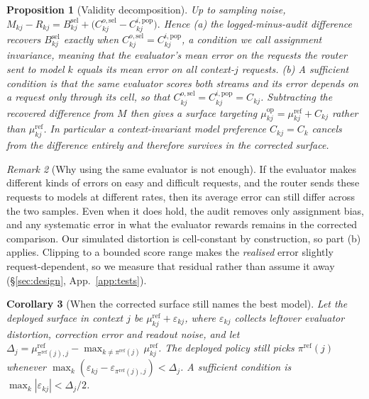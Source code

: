 \documentclass{article}
\theoremstyle{plain}
\newtheorem{proposition}{Proposition}[section]
\newtheorem{corollary}[proposition]{Corollary}
\theoremstyle{remark}
\newtheorem{remark}[proposition]{Remark}
\newcommand{\muref}{\mu^{\mathrm{ref}}}
\newcommand{\muop}{\mu^{\mathrm{op}}}
\newcommand{\Bsel}{B^{\mathrm{sel}}}
\newcommand{\piref}{\pi^{\mathrm{ref}}}
\begin{document}
\begin{proposition}[Validity decomposition]\label{prop:decomp}
Up to sampling noise,
$
M_{kj}-R_{kj}=\Bsel_{kj}+\bigl(C^{o,\mathrm{sel}}_{kj}-C^{i,\mathrm{pop}}_{kj}\bigr).
$
Hence \emph{(a)} the logged-minus-audit difference recovers $\Bsel_{kj}$ exactly when
$C^{o,\mathrm{sel}}_{kj}=C^{i,\mathrm{pop}}_{kj}$, a condition we call \emph{assignment invariance},
meaning that the evaluator's mean error on the requests the router sent to model $k$ equals its mean
error on all context-$j$ requests. \emph{(b)} A sufficient condition is that the same evaluator scores
both streams \emph{and} its error depends on a request only through its cell, so that
$C^{o,\mathrm{sel}}_{kj}=C^{i,\mathrm{pop}}_{kj}=C_{kj}$. Subtracting the recovered difference from
$M$ then gives a surface targeting $\muop_{kj}=\muref_{kj}+C_{kj}$ rather than $\muref_{kj}$. In
particular a context-invariant model preference $C_{kj}=C_k$ cancels from the difference entirely and
therefore \emph{survives} in the corrected surface.
\end{proposition}

\begin{remark}[Why using the same evaluator is not enough]\label{rem:samejudge}
If the evaluator makes different kinds of errors on easy and difficult requests, and the router sends
these requests to models at different rates, then its average error can still differ across the two
samples. Even when it does hold, the audit removes only assignment bias, and any systematic error in
what the evaluator rewards remains in the corrected comparison. Our simulated
distortion is cell-constant by construction, so part (b) applies. Clipping to a bounded score range
makes the \emph{realised} error slightly request-dependent, so we measure that residual rather than
assume it away (\S\ref{sec:design}, App.~\ref{app:tests}).
\end{remark}

\begin{corollary}[When the corrected surface still names the best model]\label{cor:margin}
Let the deployed surface in context $j$ be $\muref_{kj}+\varepsilon_{kj}$, where $\varepsilon_{kj}$
collects leftover evaluator distortion, correction error and readout noise, and let
$\Delta_j=\muref_{\piref(j),j}-\max_{k\neq\piref(j)}\muref_{kj}$. The deployed policy still picks
$\piref(j)$ whenever $\max_k(\varepsilon_{kj}-\varepsilon_{\piref(j),j})<\Delta_j$. A sufficient
condition is $\max_k|\varepsilon_{kj}|<\Delta_j/2$.
\end{corollary}
\end{document}
